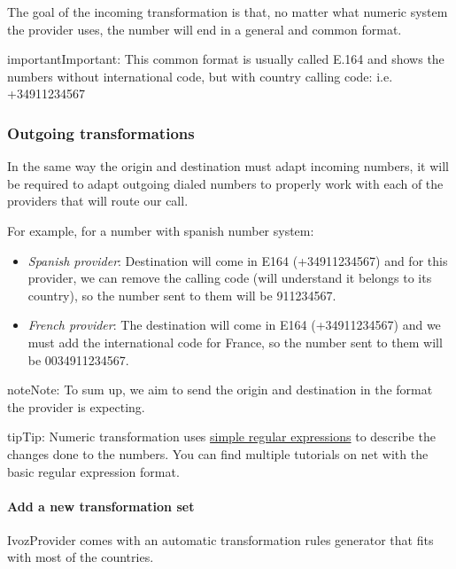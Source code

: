 \documentclass[letterpaper,10pt,english]{sphinxmanual}
\begin{document}
The goal of the incoming transformation is that, no matter what numeric system
the provider uses, the number will end in a general and common format.
\label{administration_portal/brand/settings/numeric_transformations:e164}
\begin{notice}{important}{Important:}
This common format is usually called E.164 and shows the numbers
without international code, but with country calling code: i.e. +34911234567
\end{notice}


\subsubsection{Outgoing transformations}
\label{administration_portal/brand/settings/numeric_transformations:outgoing-transformations}
In the same way the origin and destination must adapt incoming numbers, it
will be required to adapt outgoing dialed numbers to properly work with each
of the providers that will route our call.

For example, for a number with spanish number system:
\begin{itemize}
\item {} 
\emph{Spanish provider}: Destination will come in E164 (+34911234567) and for this
provider, we can remove the calling code (will understand it belongs to
its country), so the number sent to them will be 911234567.

\item {} 
\emph{French provider}: The destination will come in E164 (+34911234567) and we must
add the international code for France, so the number sent to them will be
0034911234567.

\end{itemize}

\begin{notice}{note}{Note:}
To sum up, we aim to send the origin and destination in the format the
provider is expecting.
\end{notice}

\begin{notice}{tip}{Tip:}
Numeric transformation uses \href{https://es.wikipedia.org/wiki/Expresi\%C3\%B3n\_regular}{simple regular expressions} to describe the
changes done to the numbers. You can find multiple tutorials on net with the
basic regular expression format.
\end{notice}


\paragraph{Add a new transformation set}
\label{administration_portal/brand/settings/numeric_transformations:add-a-new-transformation-set}
IvozProvider comes with an automatic transformation rules generator that fits
with most of the countries.
\end{document}
